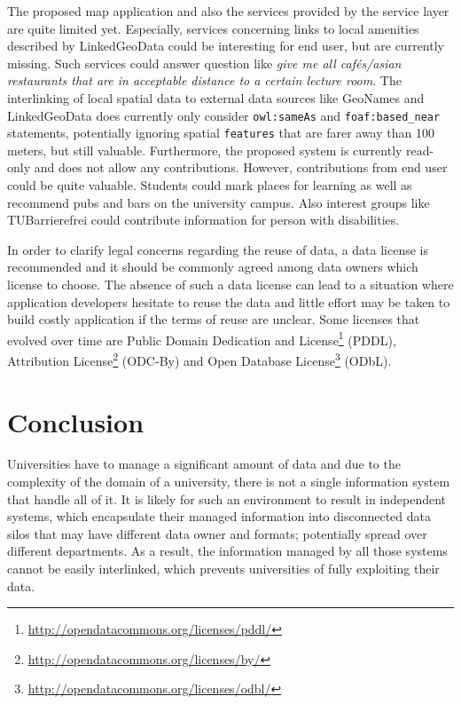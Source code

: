 \documentclass[draft,final]{vutinfth} %
\begin{document}
The proposed map application and also the services provided by the service layer are quite limited yet. Especially, services concerning links to local amenities described by LinkedGeoData could be interesting for end user, but are currently missing. Such services could answer question like \textit{give me all cafés/asian restaurants that are in acceptable distance to a certain lecture room}. The interlinking of local spatial data to external data sources like GeoNames and LinkedGeoData does currently only consider \texttt{owl:sameAs} and \texttt{foaf:based\_near} statements, potentially ignoring spatial \texttt{features} that are farer away than 100 meters, but still valuable. Furthermore, the proposed system is currently read-only and does not allow any contributions. However, contributions from end user could be quite valuable. Students could mark places for learning as well as recommend pubs and bars on the university campus. Also interest groups like TUBarrierefrei could contribute information for person with disabilities.

In order to clarify legal concerns regarding the reuse of data, a data license is recommended and it should be commonly agreed among data owners which license to choose. The absence of such a data license can lead to a situation where application developers hesitate to reuse the data and little effort may be taken to build costly application if the terms of reuse are unclear. Some licenses that evolved over time are Public Domain Dedication and License\footnote{\url{http://opendatacommons.org/licenses/pddl/}} (PDDL), Attribution License\footnote{\url{http://opendatacommons.org/licenses/by/}} (ODC-By) and Open Database License\footnote{\url{http://opendatacommons.org/licenses/odbl/}} (ODbL).

\section{Conclusion}
\label{dicussion-chapter-conclusion}

Universities have to manage a significant amount of data and due to the complexity of the domain of a university, there is not a single information system that handle all of it. It is likely for such an environment to result in independent systems, which encapsulate their managed information into disconnected data silos that may have different data owner and formats; potentially spread over different departments. As a result, the information managed by all those systems cannot be easily interlinked, which prevents universities of fully exploiting their data.
\end{document}
